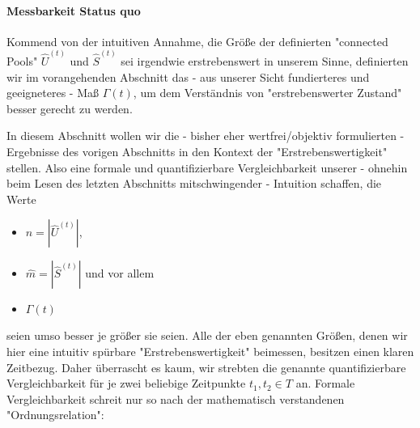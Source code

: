 
\paragraph{Messbarkeit Status quo} 
\label{sec:eco_zahlen_zustand_wp_nowVlaue}
\textrm{ }

\vspace{0.3cm}

Kommend von der intuitiven Annahme, die Größe der definierten "connected Pools" $\widehat{U}^{(t)}$ und $\widehat{S}^{(t)}$ sei irgendwie erstrebenswert in unserem Sinne, definierten wir im vorangehenden Abschnitt das - aus unserer Sicht fundierteres und geeigneteres - Maß $\Gamma(t)$, um dem Verständnis von "erstrebenswerter Zustand" besser gerecht zu werden.

In diesem Abschnitt wollen wir die - bisher eher wertfrei/objektiv formulierten -  Ergebnisse des vorigen Abschnitts in den Kontext der "Erstrebenswertigkeit" stellen. Also eine formale und quantifizierbare Vergleichbarkeit unserer - ohnehin beim Lesen des letzten Abschnitts mitschwingender - Intuition schaffen, die Werte 
\begin{itemize}
  \item $\widehat{n} = |\widehat{U}^{(t)}|$, 
  \item $\widehat{m} = |\widehat{S}^{(t)}|$ und vor allem 
  \item $\Gamma(t)$ 
\end{itemize}
seien umso besser je größer sie seien. Alle der eben genannten Größen, denen wir hier eine intuitiv spürbare "Erstrebenswertigkeit" beimessen, besitzen einen klaren Zeitbezug. Daher überrascht es kaum, wir strebten die genannte quantifizierbare Vergleichbarkeit für je zwei beliebige Zeitpunkte $t_1, t_2 \in T$ an. Formale Vergleichbarkeit schreit nur so nach der mathematisch verstandenen "Ordnungsrelation":

\vspace{0.3cm}

